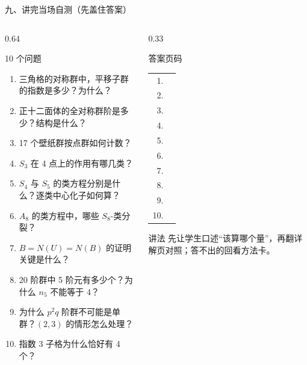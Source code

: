 \documentclass[aspectratio=169,10pt,fontset=none]{ctexbeamer}
\begin{document}
\begin{frame}[t]{九、讲完当场自测（先盖住答案）}
  \label{sec:selftest}
  \begin{columns}[T,onlytextwidth]
    \begin{column}{0.64\textwidth}
      \begin{block}{\footnotesize 10 个问题}
        \scriptsize
        \begin{enumerate}\setlength{\itemsep}{2pt}
          \item 三角格的对称群中，平移子群的指数是多少？为什么？
          \item 正十二面体的全对称群阶是多少？结构是什么？
          \item 17 个壁纸群按点群如何计数？
          \item $S_3$ 在 4 点上的作用有哪几类？
          \item $S_4$ 与 $S_5$ 的类方程分别是什么？逐类中心化子如何算？
          \item $A_8$ 的类方程中，哪些 $S_8$-类分裂？
          \item $B=N(U)=N(B)$ 的证明关键是什么？
          \item 20 阶群中 5 阶元有多少个？为什么 $n_5$ 不能等于 4？
          \item 为什么 $p^2q$ 阶群不可能是单群？$(2,3)$ 的情形怎么处理？
          \item 指数 3 子格为什么恰好有 4 个？
        \end{enumerate}
      \end{block}
    \end{column}
    \begin{column}{0.33\textwidth}
      \begin{exampleblock}{\footnotesize 答案页码}
        \scriptsize
        \begin{tabular}{@{}rl@{}}
          1. & \pageref{ex:G149}\\
          2. & \pageref{ex:G166}\\
          3. & \pageref{ex:G153}\\
          4. & \pageref{ex:G173}\\
          5. & \pageref{ex:G217}\\
          6. & \pageref{ex:G219}\\
          7. & \pageref{ex:LA305}\\
          8. & \pageref{ex:G225}\\
          9. & \pageref{ex:G226}\\
          10. & \pageref{ex:LA192}\\
        \end{tabular}
      \end{exampleblock}
      \begin{alertblock}{\footnotesize 讲法}
        \scriptsize
        先让学生口述“该算哪个量”，再翻详解页对照；答不出的回看方法卡。
      \end{alertblock}
    \end{column}
  \end{columns}
\end{frame}
\end{document}
